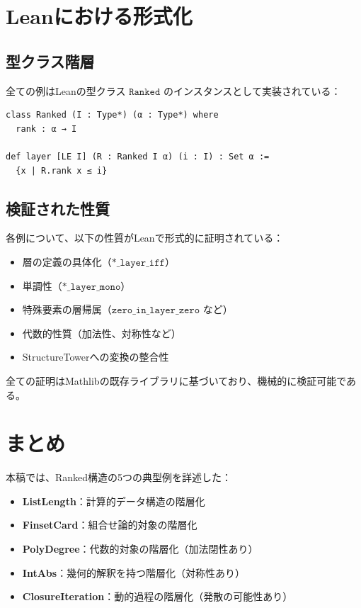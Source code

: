 \documentclass[a4paper,11pt]{ltjsarticle}
\theoremstyle{definition}
\begin{document}
\section{Leanにおける形式化}

\subsection{型クラス階層}

全ての例はLeanの型クラス $\texttt{Ranked}$ のインスタンスとして実装されている：

\begin{tcolorbox}[colback=green!5!white, colframe=green!75!black, title=型クラス定義]
\begin{verbatim}
class Ranked (I : Type*) (α : Type*) where
  rank : α → I

def layer [LE I] (R : Ranked I α) (i : I) : Set α :=
  {x | R.rank x ≤ i}
\end{verbatim}
\end{tcolorbox}

\subsection{検証された性質}

各例について、以下の性質がLeanで形式的に証明されている：

\begin{itemize}
\item 層の定義の具体化（$\texttt{*\_layer\_iff}$）
\item 単調性（$\texttt{*\_layer\_mono}$）
\item 特殊要素の層帰属（$\texttt{zero\_in\_layer\_zero}$ など）
\item 代数的性質（加法性、対称性など）
\item StructureTowerへの変換の整合性
\end{itemize}

全ての証明はMathlibの既存ライブラリに基づいており、機械的に検証可能である。

\section{まとめ}

本稿では、Ranked構造の5つの典型例を詳述した：

\begin{itemize}
\item \textbf{ListLength}：計算的データ構造の階層化
\item \textbf{FinsetCard}：組合せ論的対象の階層化
\item \textbf{PolyDegree}：代数的対象の階層化（加法閉性あり）
\item \textbf{IntAbs}：幾何的解釈を持つ階層化（対称性あり）
\item \textbf{ClosureIteration}：動的過程の階層化（発散の可能性あり）
\end{itemize}
\end{document}
